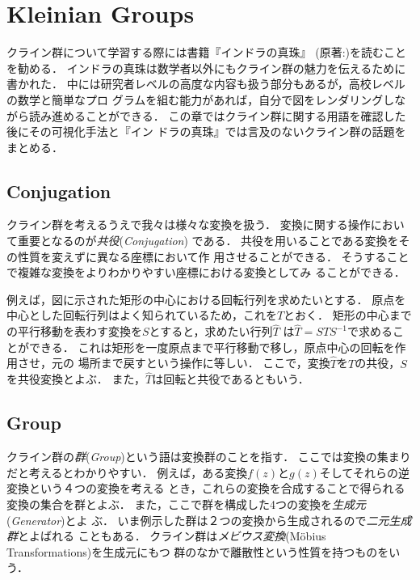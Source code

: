 
\section{Kleinian Groups}

クライン群について学習する際には書籍『インドラの真珠』\cite{komori-indra201303}
(原著:\cite{MumfordSeriesWright200204})を読むことを勧める．
インドラの真珠は数学者以外にもクライン群の魅力を伝えるために書かれた．
中には研究者レベルの高度な内容も扱う部分もあるが，高校レベルの数学と簡単なプロ
グラムを組む能力があれば，自分で図をレンダリングしながら読み進めることができる．
この章ではクライン群に関する用語を確認した後にその可視化手法と『イン
ドラの真珠』では言及のないクライン群の話題をまとめる．

\subsection{Conjugation}

クライン群を考えるうえで我々は様々な変換を扱う．
変換に関する操作において重要となるのが\emph{共役}(\textit{Conjugation})
である．
共役を用いることである変換をその性質を変えずに異なる座標において作
用させることができる．
そうすることで複雑な変換をよりわかりやすい座標における変換としてみ
ることができる．

例えば，図に示された矩形の中心における回転行列を求めたいとする．
原点を中心とした回転行列はよく知られているため，これを$T$とおく．
矩形の中心までの平行移動を表わす変換を$S$とすると，求めたい行列$\hat{T}$
は$\hat{T} = STS^{-1}$で求めることができる．
これは矩形を一度原点まで平行移動で移し，原点中心の回転を作用させ，元の
場所まで戻すという操作に等しい．
ここで，変換$\hat{T}$を$T$の共役，$S$を共役変換とよぶ．
また，$\hat{T}$は回転と共役であるともいう．

\subsection{Group}

クライン群の\emph{群}(\textit{Group})という語は変換群のことを指す．
ここでは変換の集まりだと考えるとわかりやすい．
例えば，ある変換$f(z)$と$g(z)$そしてそれらの逆変換という４つの変換を考える
とき，これらの変換を合成することで得られる変換の集合を群とよぶ．
また，ここで群を構成した4つの変換を\emph{生成元}(\textit{Generator})とよ
ぶ．
いま例示した群は２つの変換から生成されるので\emph{二元生成群}とよばれる
こともある．
クライン群は\emph{メビウス変換}(M\"obius Transformations)を生成元にもつ
群のなかで離散性という性質を持つものをいう．

